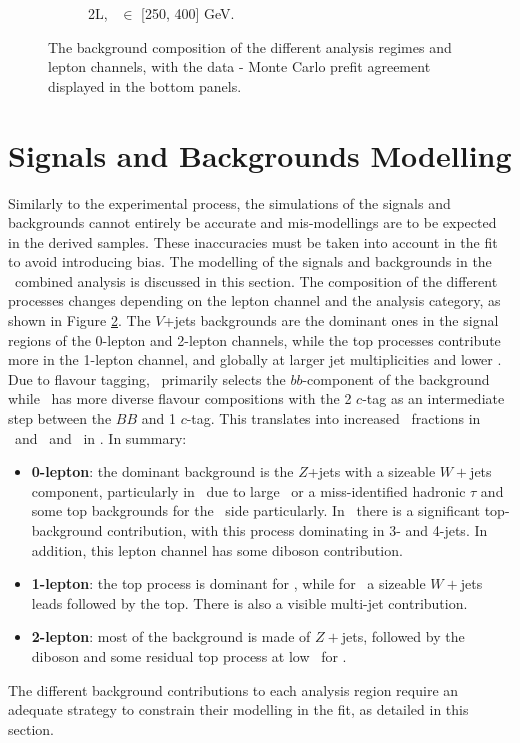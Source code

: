 \begin{figure}[h!]
{\begin{subfigure}[b]{0.37\textwidth}
            \caption{2L, \ptv\ $\in$ [250, 400] GeV.}
            \label{fig:backCom_2L_3}
        \end{subfigure} 
    }
    \caption{The background composition of the different analysis regimes and lepton channels, with the data - Monte Carlo prefit agreement displayed in the bottom panels.}
    \label{fig:backCom}
\end{figure} 

\section{Signals and Backgrounds Modelling}\label{sec-mod}
Similarly to the experimental process, the simulations of the signals and backgrounds cannot entirely be accurate and mis-modellings are to be expected in the derived samples. These inaccuracies must be taken into account in the fit to avoid introducing bias. The modelling of the signals and backgrounds in the \vhbc\ combined analysis is discussed in this section. The composition of the different processes changes depending on the lepton channel and the analysis category, as shown in Figure \ref{fig:backCom}. The $V$+jets backgrounds are the dominant ones in the signal regions of the 0-lepton and 2-lepton channels, while the top processes contribute more in the 1-lepton channel, and globally at larger jet multiplicities and lower \ptv. Due to flavour tagging, \vhb\ primarily selects the $bb$-component of the background while \vhc\ has more diverse flavour compositions with the 2 $c$-tag as an intermediate step between the $BB$ and 1 $c$-tag. This translates into increased \vhf\ fractions in \vhb\ and \vmf\ and \vlf\ in \vhc. In summary:
\begin{itemize}
    \item \textbf{0-lepton}: the dominant background is the $Z$+jets with a sizeable $W+$jets component, particularly in \vhc\ due to large \etm\ or a miss-identified hadronic $\tau$ and some top backgrounds for the \vhb\ side particularly. In \vhb\ there is a significant top-background contribution, with this process dominating in 3- and 4-jets. In addition, this lepton channel has some diboson contribution.
    \item \textbf{1-lepton}: the top process is dominant for \vhb, while for \vhc\ a sizeable $W+$jets leads followed by the top. There is also a visible multi-jet contribution.  
    \item \textbf{2-lepton}: most of the background is made of $Z+$jets, followed by the diboson and some residual top process at low \ptv\ for \vhb. 
\end{itemize}
The different background contributions to each analysis region require an adequate strategy to constrain their modelling in the fit, as detailed in this section.
  
